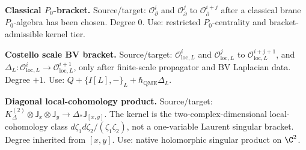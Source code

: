 \documentclass[11pt]{memoir}
\begin{document}
\par\smallskip\noindent\textbf{Classical \(P_0\)-bracket.}
Source/target: \(\mathcal O_{\partial}^{i}\) and
\(\mathcal O_{\partial}^{j}\) to \(\mathcal O_{\partial}^{i+j}\) after
a classical brane \(P_0\)-algebra has been chosen.  Degree \(0\).  Use:
restricted \(P_0\)-centrality and bracket-admissible kernel tier.

\par\smallskip\noindent\textbf{Costello scale BV bracket.}
Source/target: \(\mathcal O_{\mathrm{loc},L}^{i}\) and
\(\mathcal O_{\mathrm{loc},L}^{j}\) to
\(\mathcal O_{\mathrm{loc},L}^{i+j+1}\), and
\(\Delta_L\colon\mathcal O_{\mathrm{loc},L}^{i}
\to\mathcal O_{\mathrm{loc},L}^{i+1}\), only after finite-scale
propagator and BV Laplacian data.  Degree \(+1\).  Use:
\(Q+\{I[L],-\}_L+\hbar_{\mathrm{QME}}\Delta_L\).

\par\smallskip\noindent\textbf{Diagonal local-cohomology product.}
Source/target:
\(K^{(2)}_\Delta\otimes\mathsf J_x\otimes\mathsf J_y
\to\Delta_*\mathsf J_{[x,y]}\).  The kernel is the
two-complex-dimensional local-cohomology class
\(d\zeta_1d\zeta_2/(\zeta_1\zeta_2)\), not a one-variable Laurent
singular bracket.
Degree inherited from \([x,y]\).  Use: native holomorphic singular
product on \(\C^2\).
\par\endgroup
\end{document}
